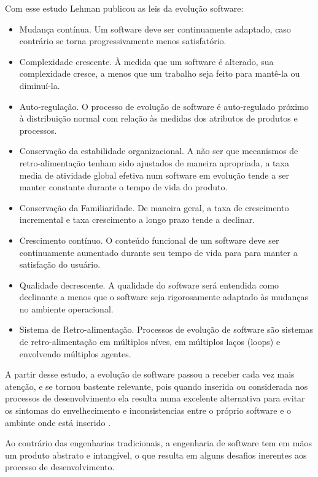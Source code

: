 Com esse estudo Lehman publicou as leis da evolução software:
\begin{itemize}
\item Mudança contínua. Um software deve ser continuamente adaptado, caso contrário se torna progressivamente menos satisfatório.
\item Complexidade crescente. À medida que um software é alterado, sua complexidade cresce, a menos que um trabalho seja feito para mantê-la ou diminuí-la.
\item Auto-regulação. O processo de evolução de software é auto-regulado próximo à distribuição normal com relação às medidas dos atributos de produtos e processos.
\item Conservação da estabilidade organizacional. A não ser que mecanismos de retro-alimentação tenham sido ajustados de maneira apropriada, a taxa media de atividade global efetiva num software em evolução tende a ser manter constante durante o tempo de vida do produto.
\item Conservação da Familiaridade. De maneira geral, a taxa de crescimento incremental e taxa crescimento a longo prazo tende a declinar.
\item Crescimento contínuo. O conteúdo funcional de um software deve ser continuamente aumentado durante seu tempo de vida para para manter a satisfação do usuário.
\item Qualidade decrescente. A qualidade do software será entendida como declinante a menos que o software seja rigorosamente adaptado às mudanças no ambiente operacional.
\item Sistema de Retro-alimentação. Processos de evolução de software são sistemas de retro-alimentação em múltiplos níves, em múltiplos laços (loops) e envolvendo múltiplos agentes.
\end{itemize}

A partir desse estudo, a evolução de software passou a receber cada vez mais atenção, e se tornou bastente relevante,  pois quando inserida ou considerada nos processos de desenvolvimento ela resulta numa excelente alternativa para evitar os sintomas do envelhecimento e inconsistencias entre o próprio software e o ambinte onde está inserido \cite{mens2005challenges}. 

Ao contrário das engenharias tradicionais, a engenharia de software tem em mãos um produto abstrato e intangível, o que resulta em alguns desafios inerentes aos processo de desenvolvimento.

